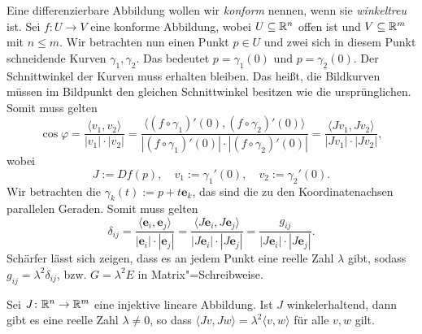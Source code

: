 Eine differenzierbare Abbildung wollen wir
\emph{konform} nennen, wenn
sie \emph{winkeltreu} ist.
Sei $f\colon U\to V$ eine konforme Abbildung, wobei $U\subseteq\mathbb R^n$
offen ist und $V\subseteq\mathbb R^m$ mit $n\le m$. Wir betrachten nun
einen Punkt $p\in U$ und zwei sich in diesem Punkt
schneidende Kurven $\gamma_1,\gamma_2$. Das bedeutet $p=\gamma_1(0)$
und $p=\gamma_2(0)$. Der Schnittwinkel der Kurven muss erhalten
bleiben. Das heißt, die
Bildkurven müssen im Bildpunkt den gleichen Schnittwinkel besitzen
wie die ursprünglichen. Somit muss gelten%
\begin{equation}
\cos\varphi =
\frac{\langle v_1,v_2\rangle}{|v_1|\cdot |v_2|}
= \frac{\langle(f\circ\gamma_1)'(0),(f\circ\gamma_2)'(0)\rangle}
{|(f\circ\gamma_1)'(0)|\cdot |(f\circ\gamma_2)'(0)|}
= \frac{\langle Jv_1,Jv_2\rangle}{|Jv_1|\cdot |Jv_2|},
\end{equation}
wobei
\[J:=Df(p),\quad v_1:=\gamma_1'(0),\quad v_2:=\gamma_2'(0).\]
Wir betrachten die $\gamma_k(t):=p+t\mathbf e_k$, das sind die zu
den Koordinatenachsen parallelen Geraden. Somit muss gelten%
\begin{equation}\label{eq:winkeltreu-ONB}
\delta_{ij} = \frac{\langle\mathbf e_i,\mathbf e_j\rangle}
{|\mathbf e_i|\cdot |\mathbf e_j|}
= \frac{\langle J\mathbf e_i,J\mathbf e_j\rangle}
{|J\mathbf e_i|\cdot |J\mathbf e_j|}
= \frac{g_{ij}}{|J\mathbf e_i|\cdot |J\mathbf e_j|}.
\end{equation}
Schärfer lässt sich zeigen, dass es an jedem Punkt eine reelle Zahl
$\lambda$ gibt, sodass $g_{ij} = \lambda^2\delta_{ij}$,
bzw. $G = \lambda^2 E$ in Matrix"=Schreibweise.

\begin{theorem}\label{konform-lambda}
Sei $J\colon\mathbb R^n\to\mathbb R^m$ eine injektive lineare Abbildung. Ist $J$
winkelerhaltend, dann gibt es eine reelle Zahl $\lambda\ne 0$, so dass
$\langle Jv,Jw\rangle = \lambda^2\langle v,w\rangle$ für alle
$v,w$ gilt.
\end{theorem}


